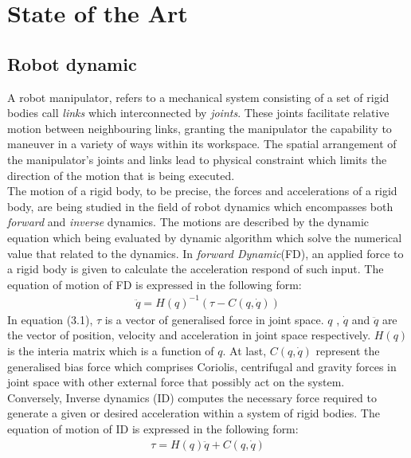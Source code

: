 \documentclass[report.tex]{subfiles}
\begin{document}
    \chapter{State of the Art}
    \label{State of the Art}
    \section{Robot dynamic}
    \noindent A robot manipulator, refers to a mechanical system consisting of a set of rigid bodies call \textit{links} which interconnected by \textit{joints}. These joints facilitate relative motion between neighbouring links, granting the manipulator the capability to maneuver in a variety of ways within its workspace. The spatial arrangement of the manipulator's joints and links lead to physical constraint which limits the direction of the motion that is being executed.\\
    The motion of a rigid body, to be precise, the forces and accelerations of a rigid body, are being studied in the field of robot dynamics which encompasses both \textit{forward} and \textit{inverse} dynamics. The motions are described by the dynamic equation which being evaluated by dynamic algorithm which solve the numerical value that related to the dynamics\cite{featherstone2007book}.
    In \textit{forward Dynamic}(FD), an applied force to a rigid body is given to calculate the acceleration respond of such input\cite{featherstone2007book}. The equation of motion of FD is expressed in the following form:
    \begin{align}
            \ddot{q} = H(q)^{-1}(\tau - C(q,\dot{q}))
    \end{align}
    In equation (3.1), $\tau$ is a vector of generalised force in joint space. $q$ , $\dot{q}$ and $\ddot{q}$ are the vector of position, velocity and acceleration in joint space respectively. $H(q)$ is the interia matrix which is a function of $q$. At last, $C(q,\dot{q})$ represent the generalised bias force which comprises Coriolis, centrifugal and gravity forces in joint space with other external force that possibly act on the system\cite{featherstone2007book}.\\
    Conversely, Inverse dynamics (ID) computes the necessary force required to generate a given or desired acceleration within a system of rigid bodies. The equation of motion of ID is expressed in the following form\cite{featherstone2007book}:
    \begin{align}
        \tau  = H(q)\ddot{q}+ C(q,\dot{q})
    \end{align}
\end{document}
